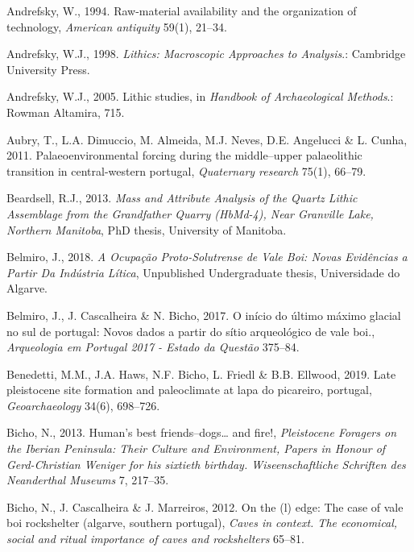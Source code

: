 \documentclass[12pt,twoside]{reedthesis}
\begin{document}
\leavevmode\hypertarget{ref-andrefsky1994}{}%
Andrefsky, W., 1994. Raw-material availability and the organization of technology, \emph{American antiquity} 59(1), 21--34.

\leavevmode\hypertarget{ref-andrefsky1998}{}%
Andrefsky, W.J., 1998. \emph{Lithics: Macroscopic Approaches to Analysis}.: Cambridge University Press.

\leavevmode\hypertarget{ref-andrefsky2005}{}%
Andrefsky, W.J., 2005. Lithic studies, in \emph{Handbook of Archaeological Methods}.: Rowman Altamira, 715.

\leavevmode\hypertarget{ref-aubryetal2011}{}%
Aubry, T., L.A. Dimuccio, M. Almeida, M.J. Neves, D.E. Angelucci \& L. Cunha, 2011. Palaeoenvironmental forcing during the middle--upper palaeolithic transition in central-western portugal, \emph{Quaternary research} 75(1), 66--79.

\leavevmode\hypertarget{ref-beardsell2013}{}%
Beardsell, R.J., 2013. \emph{\textup{Mass and Attribute Analysis of the Quartz Lithic Assemblage from the Grandfather Quarry (HbMd-4), Near Granville Lake, Northern Manitoba}}, PhD thesis, University of Manitoba.

\leavevmode\hypertarget{ref-belmiro2018}{}%
Belmiro, J., 2018. \emph{\textup{A Ocupação Proto-Solutrense de Vale Boi: Novas Evidências a Partir Da Indústria Lítica}}, Unpublished Undergraduate thesis, Universidade do Algarve.

\leavevmode\hypertarget{ref-belmiro2017}{}%
Belmiro, J., J. Cascalheira \& N. Bicho, 2017. O início do último máximo glacial no sul de portugal: Novos dados a partir do sítio arqueológico de vale boi., \emph{Arqueologia em Portugal 2017 - Estado da Questão} 375--84.

\leavevmode\hypertarget{ref-benedettietal2019}{}%
Benedetti, M.M., J.A. Haws, N.F. Bicho, L. Friedl \& B.B. Ellwood, 2019. Late pleistocene site formation and paleoclimate at lapa do picareiro, portugal, \emph{Geoarchaeology} 34(6), 698--726.

\leavevmode\hypertarget{ref-bicho2013}{}%
Bicho, N., 2013. Human's best friends--dogs\ldots{} and fire!, \emph{Pleistocene Foragers on the Iberian Peninsula: Their Culture and Environment, Papers in Honour of Gerd-Christian Weniger for his sixtieth birthday. Wiseenschaftliche Schriften des Neanderthal Museums} 7, 217--35.

\leavevmode\hypertarget{ref-bichoetal2012}{}%
Bicho, N., J. Cascalheira \& J. Marreiros, 2012. On the (l) edge: The case of vale boi rockshelter (algarve, southern portugal), \emph{Caves in context. The economical, social and ritual importance of caves and rockshelters} 65--81.
\end{document}
